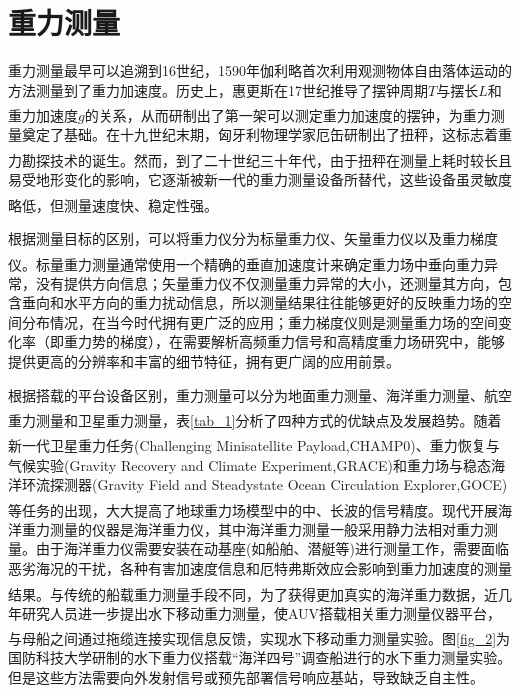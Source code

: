 \documentclass[12pt,a4,utf8]{article}
\newcommand{\upcite}[1]{\textsuperscript{\textsuperscript{\cite{#1}}}} %
\begin{document}
\section{重力测量}
      重力测量最早可以追溯到16世纪，1590年伽利略首次利用观测物体自由落体运动的方法测量到了重力加速度。历史上，惠更斯在17世纪推导了摆钟周期$T$与摆长$L$和重力加速度$g$的关系，从而研制出了第一架可以测定重力加速度的摆钟\upcite{snelders1989christiaan}，为重力测量奠定了基础。在十九世纪末期，匈牙利物理学家厄缶研制出了扭秤，这标志着重力勘探技术的诞生\upcite{szabo2016history,veryaskin2021gravity}。然而，到了二十世纪三十年代，由于扭秤在测量上耗时较长且易受地形变化的影响，它逐渐被新一代的重力测量设备所替代，这些设备虽灵敏度略低，但测量速度快、稳定性强\upcite{chendaiyong}。

根据测量目标的区别，可以将重力仪分为标量重力仪、矢量重力仪以及重力梯度仪\upcite{schwarz1995some}。标量重力测量通常使用一个精确的垂直加速度计来确定重力场中垂向重力异常，没有提供方向信息；矢量重力仪不仅测量重力异常的大小，还测量其方向，包含垂向和水平方向的重力扰动信息，所以测量结果往往能够更好的反映重力场的空间分布情况，在当今时代拥有更广泛的应用；重力梯度仪则是测量重力场的空间变化率（即重力势的梯度），在需要解析高频重力信号和高精度重力场研究中，能够提供更高的分辨率和丰富的细节特征，拥有更广阔的应用前景。

根据搭载的平台设备区别，重力测量可以分为地面重力测量、海洋重力测量、航空重力测量和卫星重力测量\upcite{hirt2013new,liang2020high,kwon2001new}，表\ref{tab_1}分析了四种方式的优缺点及发展趋势。随着新一代卫星重力任务(Challenging Minisatellite Payload,CHAMP0)\upcite{reigber2002champ}、重力恢复与气候实验(Gravity Recovery and Climate Experiment,GRACE)和重力场与稳态海洋环流探测器(Gravity Field and Steadystate Ocean Circulation Explorer,GOCE)等任务的出现\upcite{tapley1997teg,drinkwater2003vii,liang2020high}，大大提高了地球重力场模型中的中、长波的信号精度。现代开展海洋重力测量的仪器是海洋重力仪，其中海洋重力测量一般采用静力法相对重力测量。由于海洋重力仪需要安装在动基座(如船舶、潜艇等)进行测量工作，需要面临恶劣海况的干扰，各种有害加速度信息和厄特弗斯效应会影响到重力加速度的测量结果\upcite{ZGZC201808001017}。与传统的船载重力测量手段不同，为了获得更加真实的海洋重力数据，近几年研究人员进一步提出水下移动重力测量，使AUV搭载相关重力测量仪器平台，与母船之间通过拖缆连接实现信息反馈，实现水下移动重力测量实验\upcite{1021532813.nh}。图\ref{fig_2}为国防科技大学研制的水下重力仪搭载“海洋四号”调查船进行的水下重力测量实验。但是这些方法需要向外发射信号或预先部署信号响应基站，导致缺乏自主性。
\end{document}
